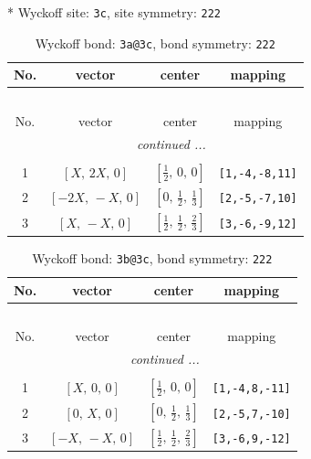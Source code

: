 \documentclass[fleqn,8pt]{jsarticle}
\begin{document}
* Wyckoff site: {\tt 3c}, site symmetry: {\tt 222}
\renewcommand{\arraystretch}{1.2}
\begin{longtable}{cccc}
\caption{Wyckoff bond: {\tt 3a@3c}, bond symmetry: {\tt 222}}
 \\
 \hline \hline
No. & vector & center & mapping \\ \hline \endfirsthead

\multicolumn{3}{l}{\tablename\ \thetable{}} \\
 \hline \hline
No. & vector & center & mapping \\ \hline \endhead

 \hline \hline
\multicolumn{3}{r}{\footnotesize\it continued ...} \\ \endfoot

 \hline \hline
\multicolumn{3}{r}{} \\ \endlastfoot

1 & $\left[ X,\, 2 X,\, 0 \right]$ & $\left[ \frac{1}{2},\, 0,\, 0 \right]$ & {\tt [1,-4,-8,11]} \\ \hline
2 & $\left[ - 2 X,\, - X,\, 0 \right]$ & $\left[ 0,\, \frac{1}{2},\, \frac{1}{3} \right]$ & {\tt [2,-5,-7,10]} \\ \hline
3 & $\left[ X,\, - X,\, 0 \right]$ & $\left[ \frac{1}{2},\, \frac{1}{2},\, \frac{2}{3} \right]$ & {\tt [3,-6,-9,12]} \\
\end{longtable}
\renewcommand{\arraystretch}{1.2}
\begin{longtable}{cccc}
\caption{Wyckoff bond: {\tt 3b@3c}, bond symmetry: {\tt 222}}
 \\
 \hline \hline
No. & vector & center & mapping \\ \hline \endfirsthead

\multicolumn{3}{l}{\tablename\ \thetable{}} \\
 \hline \hline
No. & vector & center & mapping \\ \hline \endhead

 \hline \hline
\multicolumn{3}{r}{\footnotesize\it continued ...} \\ \endfoot

 \hline \hline
\multicolumn{3}{r}{} \\ \endlastfoot

1 & $\left[ X,\, 0,\, 0 \right]$ & $\left[ \frac{1}{2},\, 0,\, 0 \right]$ & {\tt [1,-4,8,-11]} \\ \hline
2 & $\left[ 0,\, X,\, 0 \right]$ & $\left[ 0,\, \frac{1}{2},\, \frac{1}{3} \right]$ & {\tt [2,-5,7,-10]} \\ \hline
3 & $\left[ - X,\, - X,\, 0 \right]$ & $\left[ \frac{1}{2},\, \frac{1}{2},\, \frac{2}{3} \right]$ & {\tt [3,-6,9,-12]} \\
\end{longtable}
\end{document}
